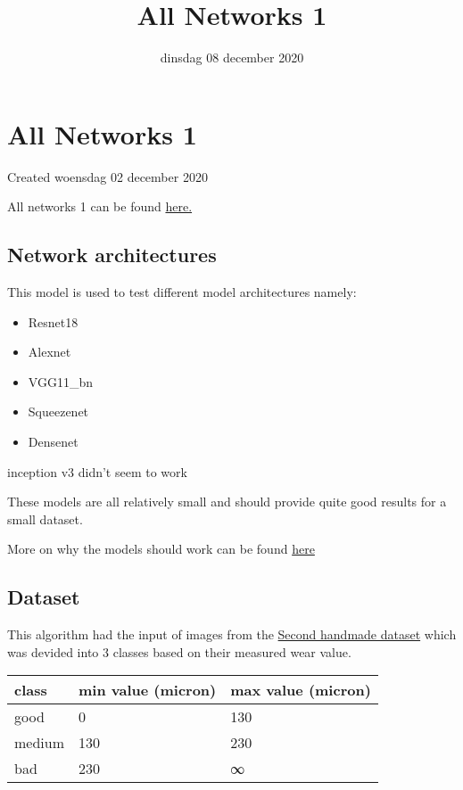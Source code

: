 \documentclass{scrartcl}
\title{All Networks 1}
\date{dinsdag 08 december 2020}
\author{}
\begin{document}
\maketitle

		\section{All Networks 1}

Created woensdag 02 december 2020



All networks 1 can be found \href{https://colab.research.google.com/drive/1bWt0DgypiYoOOgnSGjlmSdDo7elvJnH4}{here.}



\subsection{Network architectures}

This model is used to test different model architectures namely:

\begin{itemize}
\item Resnet18
\item Alexnet
\item VGG11\_bn
\item Squeezenet
\item Densenet
\end{itemize}


inception v3 didn't seem to work



These models are all relatively small and should provide quite good results for a small dataset. 

More on why the models should work can be found \href{../../../../Research/Vision_Algorithm/camera_position_validation.tex}{here}



\subsection{Dataset}



This algorithm had the input of images from the \href{../../../Dataset/handmade_datasets/Second_handmade_dataset.tex}{Second handmade dataset} which was devided into 3 classes based on their measured wear value. 

\begin{tabular}{ |l|l|l| }
\hline
 class & min value (micron) & max value (micron) \tabularnewline
\hline
\hline
 good & 0 & 130 \tabularnewline
\hline
 medium & 130 & 230 \tabularnewline
\hline
 bad & 230 & ∞ \tabularnewline
\hline
\end{tabular}
\end{document}
